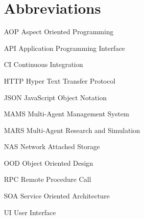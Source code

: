     \newcommand{\abbrlabel}[1]{\makebox[3cm][l]{\textbf{#1}\ }}
\newenvironment{abbreviations}{\begin{list}{}{\renewcommand{\makelabel}{\abbrlabel}}}{\end{list}}
%

\newpage
\chapter*{Abbreviations}
\begin{abbreviations}
\item[AOP] Aspect Oriented Programming
\item[API] Application Programming Interface
\item[CI] Continuous Integration
\item[HTTP] Hyper Text Transfer Protocol
\item[JSON] JavaScript Object Notation
\item[MAMS] Multi-Agent Management System
\item[MARS] Multi-Agent Research and Simulation
\item[NAS] Network Attached Storage
\item[OOD] Object Oriented Design
\item[RPC] Remote Procedure Call
\item[SOA] Service Oriented Architecture
\item[UI] User Interface
\end{abbreviations}
%